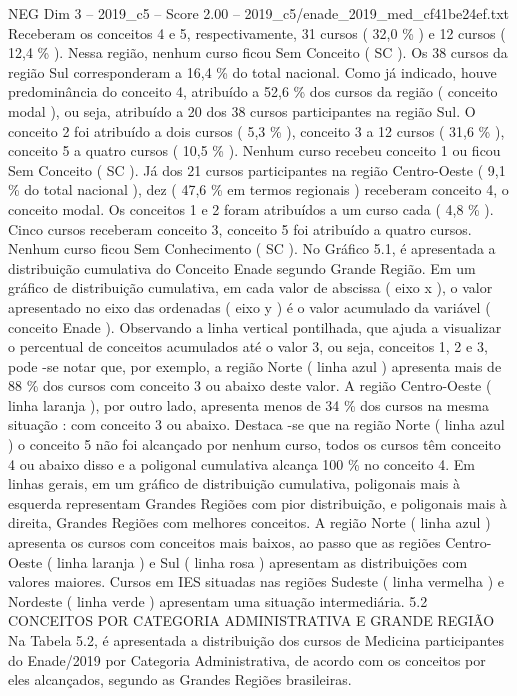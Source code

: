 \begin{textsample}{NEG Dim 3 – 2019\_c5 – Score 2.00 – 2019\_c5/enade\_2019\_med\_cf41be24ef.txt}
Receberam os conceitos 4 e 5, respectivamente, 31 cursos ( 32,0 \% ) e 12 cursos ( 12,4 \% ).
Nessa região, nenhum curso ficou Sem Conceito ( SC ).
Os 38 cursos da região Sul corresponderam a 16,4 \% do total nacional.
Como já indicado, houve predominância do conceito 4, atribuído a 52,6 \% dos cursos da região ( conceito modal ), ou seja, atribuído a 20 dos 38 cursos participantes na região Sul.
O conceito 2 foi atribuído a dois cursos ( 5,3 \% ), conceito 3 a 12 cursos ( 31,6 \% ), conceito 5 a quatro cursos ( 10,5 \% ).
Nenhum curso recebeu conceito 1 ou ficou Sem Conceito ( SC ).
Já dos 21 cursos participantes na região Centro-Oeste ( 9,1 \% do total nacional ), dez ( 47,6 \% em termos regionais ) receberam conceito 4, o conceito modal.
Os conceitos 1 e 2 foram atribuídos a um curso cada ( 4,8 \% ).
Cinco cursos receberam conceito 3, conceito 5 foi atribuído a quatro cursos.
Nenhum curso ficou Sem Conhecimento ( SC ).
No Gráfico 5.1, é apresentada a distribuição cumulativa do Conceito Enade segundo Grande Região.
Em um gráfico de distribuição cumulativa, em cada valor de abscissa ( eixo x ), o valor apresentado no eixo das ordenadas ( eixo y ) é o valor acumulado da variável ( conceito Enade ).
Observando a linha vertical pontilhada, que ajuda a visualizar o percentual de conceitos acumulados até o valor 3, ou seja, conceitos 1, 2 e 3, pode -se notar que, por exemplo, a região Norte ( linha azul ) apresenta mais de 88 \% dos cursos com conceito 3 ou abaixo deste valor.
A região Centro-Oeste ( linha laranja ), por outro lado, apresenta menos de 34 \% dos cursos na mesma situação : com conceito 3 ou abaixo.
Destaca -se que na região Norte ( linha azul ) o conceito 5 não foi alcançado por nenhum curso, todos os cursos têm conceito 4 ou abaixo disso e a poligonal cumulativa alcança 100 \% no conceito 4.
Em linhas gerais, em um gráfico de distribuição cumulativa, poligonais mais à esquerda representam Grandes Regiões com pior distribuição, e poligonais mais à direita, Grandes Regiões com melhores conceitos.
A região Norte ( linha azul ) apresenta os cursos com conceitos mais baixos, ao passo que as regiões Centro-Oeste ( linha laranja ) e Sul ( linha rosa ) apresentam as distribuições com valores maiores.
Cursos em IES situadas nas regiões Sudeste ( linha vermelha ) e Nordeste ( linha verde ) apresentam uma situação intermediária. 5.2 CONCEITOS POR CATEGORIA ADMINISTRATIVA E GRANDE REGIÃO Na Tabela 5.2, é apresentada a distribuição dos cursos de Medicina participantes do Enade/2019 por Categoria Administrativa, de acordo com os conceitos por eles alcançados, segundo as Grandes Regiões brasileiras.

\end{textsample}

